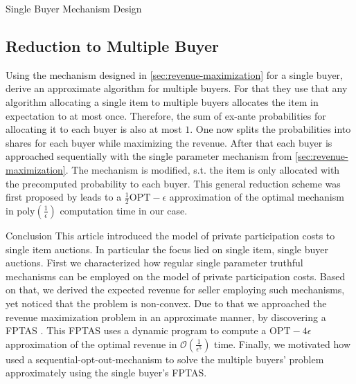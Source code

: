 \documentclass[11pt,a4paper]{article}
\newcommand{\1}[1]{\mbox{\rm\bf 1}_{#1}}
\begin{document}
\begin{section}{Single Buyer Mechanism Design}
 \subsection{Reduction to Multiple Buyer}
 Using the mechanism designed in \cref{sec:revenue-maximization} for a single buyer, \citet{primary} derive an approximate algorithm for multiple buyers.
 For that they use that any algorithm allocating a single item to multiple buyers allocates the item in expectation to at most once.
 Therefore, the sum of ex-ante probabilities for allocating it to each buyer is also at most $1$.
 One now splits the probabilities into shares for each buyer while maximizing the revenue.
 After that each buyer is approached sequentially with the single parameter mechanism from \cref{sec:revenue-maximization}.
 The mechanism is modified, s.t. the item is only allocated with the precomputed probability to each buyer.
 This general reduction scheme was first proposed by \citet{alaei2012bayesian,alaei2014bayesian} leads to a $\frac{1}{2}\mathrm{OPT} - \epsilon$ approximation of the optimal mechanism in $\mathrm{poly}\left(\frac{1}{\epsilon}\right)$ computation time in our case.
\end{section}

\begin{section}{Conclusion}
 This article introduced the model of private participation costs to single item auctions.
 In particular the focus lied on single item, single buyer auctions.
 First we characterized how regular single parameter truthful mechanisms can be employed on the model of private participation costs.
 Based on that, we derived the expected revenue for seller employing such mechanisms, yet noticed that the problem is non-convex.
 Due to that we approached the revenue maximization problem in an approximate manner, by discovering a FPTAS \cite{primary}.
 This FPTAS uses a dynamic program to compute a $\mathrm{OPT}-4\epsilon$ approximation of the optimal revenue in $\mathcal{O}\left(\frac{1}{\epsilon^5}\right)$ time.
 Finally, we motivated how \citet{primary} used a sequential-opt-out-mechanism to solve the multiple buyers' problem approximately using the single buyer's FPTAS.
\end{section}

\end{document}

